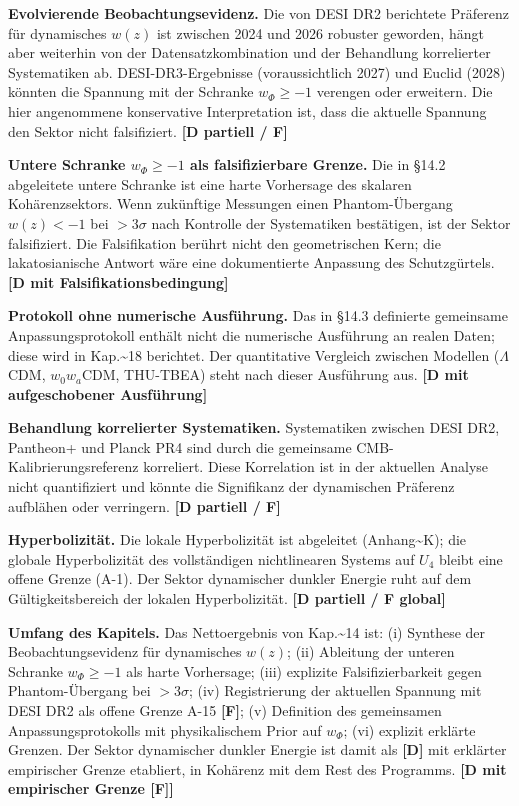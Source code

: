 ﻿\documentclass[11pt,letterpaper]{article}
\begin{document}
\textbf{Evolvierende Beobachtungsevidenz.} Die von DESI DR2 berichtete Präferenz für dynamisches $w(z)$ ist zwischen 2024 und 2026 robuster geworden, hängt aber weiterhin von der Datensatzkombination und der Behandlung korrelierter Systematiken ab. DESI-DR3-Ergebnisse (voraussichtlich 2027) und Euclid (2028) könnten die Spannung mit der Schranke $w_\Phi \geq -1$ verengen oder erweitern. Die hier angenommene konservative Interpretation ist, dass die aktuelle Spannung den Sektor nicht falsifiziert. \textbf{[D partiell / F]}

\textbf{Untere Schranke $w_\Phi \geq -1$ als falsifizierbare Grenze.} Die in §14.2 abgeleitete untere Schranke ist eine harte Vorhersage des skalaren Kohärenzsektors. Wenn zukünftige Messungen einen Phantom-Übergang $w(z) < -1$ bei $> 3\sigma$ nach Kontrolle der Systematiken bestätigen, ist der Sektor falsifiziert. Die Falsifikation berührt nicht den geometrischen Kern; die lakatosianische Antwort wäre eine dokumentierte Anpassung des Schutzgürtels. \textbf{[D mit Falsifikationsbedingung]}

\textbf{Protokoll ohne numerische Ausführung.} Das in §14.3 definierte gemeinsame Anpassungsprotokoll enthält nicht die numerische Ausführung an realen Daten; diese wird in Kap.\textasciitilde{}18 berichtet. Der quantitative Vergleich zwischen Modellen ($\Lambda$CDM, $w_0w_a$CDM, THU-TBEA) steht nach dieser Ausführung aus. \textbf{[D mit aufgeschobener Ausführung]}

\textbf{Behandlung korrelierter Systematiken.} Systematiken zwischen DESI DR2, Pantheon+ und Planck PR4 sind durch die gemeinsame CMB-Kalibrierungsreferenz korreliert. Diese Korrelation ist in der aktuellen Analyse nicht quantifiziert und könnte die Signifikanz der dynamischen Präferenz aufblähen oder verringern. \textbf{[D partiell / F]}

\textbf{Hyperbolizität.} Die lokale Hyperbolizität ist abgeleitet (Anhang\textasciitilde{}K); die globale Hyperbolizität des vollständigen nichtlinearen Systems auf $U_4$ bleibt eine offene Grenze (A-1). Der Sektor dynamischer dunkler Energie ruht auf dem Gültigkeitsbereich der lokalen Hyperbolizität. \textbf{[D partiell / F global]}

\textbf{Umfang des Kapitels.} Das Nettoergebnis von Kap.\textasciitilde{}14 ist: (i) Synthese der Beobachtungsevidenz für dynamisches $w(z)$; (ii) Ableitung der unteren Schranke $w_\Phi \geq -1$ als harte Vorhersage; (iii) explizite Falsifizierbarkeit gegen Phantom-Übergang bei $> 3\sigma$; (iv) Registrierung der aktuellen Spannung mit DESI DR2 als offene Grenze A-15 \textbf{[F]}; (v) Definition des gemeinsamen Anpassungsprotokolls mit physikalischem Prior auf $w_\Phi$; (vi) explizit erklärte Grenzen. Der Sektor dynamischer dunkler Energie ist damit als \textbf{[D]} mit erklärter empirischer Grenze etabliert, in Kohärenz mit dem Rest des Programms. \textbf{[D mit empirischer Grenze [F]]}
\end{document}
